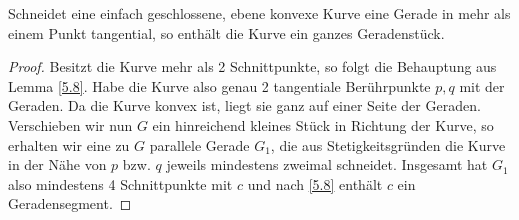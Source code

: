 \documentclass[11pt]{scrbook}
\begin{document}
\begin{lem}
\label{5.9}
Schneidet eine einfach geschlossene, ebene konvexe Kurve eine Gerade in mehr als einem Punkt tangential, so enthält die Kurve ein ganzes Geradenstück.

\begin{proof}
Besitzt die Kurve mehr als 2 Schnittpunkte, so folgt die Behauptung aus Lemma \ref{5.8}. Habe die Kurve also genau 2 tangentiale Berührpunkte $p, q$ mit der Geraden. Da die Kurve konvex ist, liegt sie ganz auf einer Seite der Geraden. Verschieben wir nun $G$ ein hinreichend kleines Stück in Richtung der Kurve, so erhalten wir eine zu $G$ parallele Gerade $G_1$, die aus Stetigkeitsgründen die Kurve in der Nähe von $p$ bzw. $q$ jeweils mindestens zweimal schneidet. Insgesamt hat $G_1$ also mindestens 4 Schnittpunkte mit $c$ und nach \ref{5.8} enthält $c$ ein Geradensegment. 
\end{proof}
\end{lem}
\end{document}
